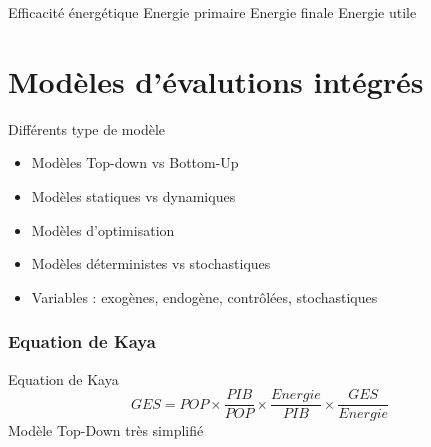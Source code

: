 \documentclass{beamer}
\begin{document}
\begin{frame}{Efficacité énergétique}
Energie primaire
Energie finale
Energie utile
\end{frame}

\section{Modèles d'évalutions intégrés}

\begin{frame}{Différents type de modèle}
\begin{itemize}
 \item Modèles Top-down vs Bottom-Up
 \item Modèles statiques vs dynamiques
 \item Modèles d'optimisation
 \item Modèles déterministes vs stochastiques
 \item Variables : exogènes, endogène, contrôlées, stochastiques
\end{itemize}
\end{frame}



\begin{frame}
\frametitle{Equation de Kaya}
Equation de Kaya
\begin{equation*}
GES=POP \times \frac{PIB}{POP} \times \frac{Energie}{PIB}\times \frac{GES}{Energie}
\end{equation*}
\pause
Modèle Top-Down très simplifié
\end{frame}
\end{document}
